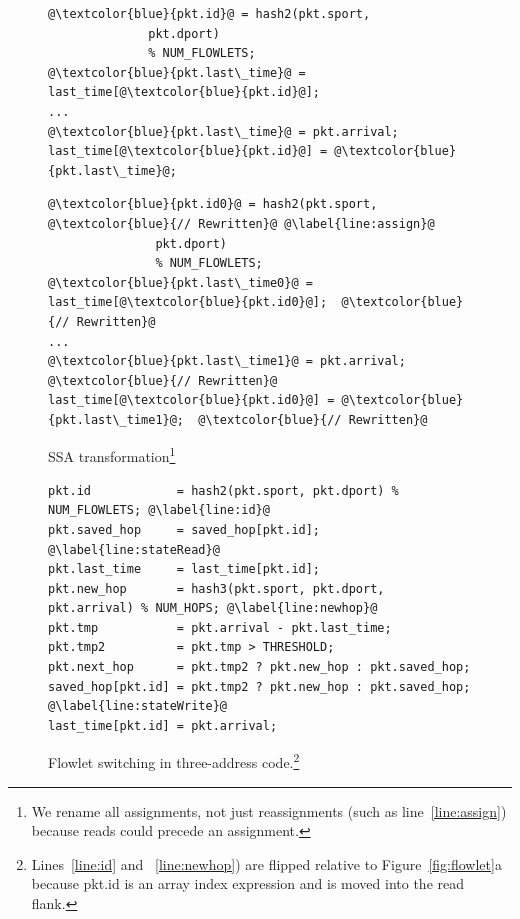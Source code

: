 \begin{figure}[!t]
  \begin{minipage}{\textwidth}
  \begin{minipage}{0.43\textwidth}
  \begin{small}
  \begin{lstlisting}[style=customc]
@\textcolor{blue}{pkt.id}@ = hash2(pkt.sport,
              pkt.dport)
              % NUM_FLOWLETS;
@\textcolor{blue}{pkt.last\_time}@ = last_time[@\textcolor{blue}{pkt.id}@];
...
@\textcolor{blue}{pkt.last\_time}@ = pkt.arrival;
last_time[@\textcolor{blue}{pkt.id}@] = @\textcolor{blue}{pkt.last\_time}@;
  \end{lstlisting}
  \end{small}
  \end{minipage}
  \begin{minipage}{0.57\textwidth}
  \begin{small}
  \begin{lstlisting}[style=customc]
  @\textcolor{blue}{pkt.id0}@ = hash2(pkt.sport, @\textcolor{blue}{// Rewritten}@ @\label{line:assign}@
               pkt.dport)
               % NUM_FLOWLETS;
@\textcolor{blue}{pkt.last\_time0}@ = last_time[@\textcolor{blue}{pkt.id0}@];  @\textcolor{blue}{// Rewritten}@
...
@\textcolor{blue}{pkt.last\_time1}@ = pkt.arrival;  @\textcolor{blue}{// Rewritten}@
last_time[@\textcolor{blue}{pkt.id0}@] = @\textcolor{blue}{pkt.last\_time1}@;  @\textcolor{blue}{// Rewritten}@
  \end{lstlisting}
  \end{small}
  \end{minipage}
  \caption[title]{SSA transformation\footnote{We rename all assignments, not just reassignments (such as line~\ref{line:assign}) because reads could precede an assignment.}}
  \label{fig:ssa}
\end{minipage}
\end{figure}
\begin{figure}[!t]
\begin{minipage}{\textwidth}
\begin{lstlisting}[style=customc]
pkt.id            = hash2(pkt.sport, pkt.dport) % NUM_FLOWLETS; @\label{line:id}@
pkt.saved_hop     = saved_hop[pkt.id]; @\label{line:stateRead}@
pkt.last_time     = last_time[pkt.id];
pkt.new_hop       = hash3(pkt.sport, pkt.dport, pkt.arrival) % NUM_HOPS; @\label{line:newhop}@
pkt.tmp           = pkt.arrival - pkt.last_time;
pkt.tmp2          = pkt.tmp > THRESHOLD;
pkt.next_hop      = pkt.tmp2 ? pkt.new_hop : pkt.saved_hop;
saved_hop[pkt.id] = pkt.tmp2 ? pkt.new_hop : pkt.saved_hop; @\label{line:stateWrite}@
last_time[pkt.id] = pkt.arrival;
\end{lstlisting}
\caption[title2]{Flowlet switching in three-address
code.\footnote{Lines~\ref{line:id} and ~\ref{line:newhop}) are flipped relative
to Figure~\ref{fig:flowlet}a because pkt.id is an array index expression and is
moved into the read flank.}}
\label{fig:three_address}
\end{minipage}
\vspace{-0.5cm}
\end{figure}


